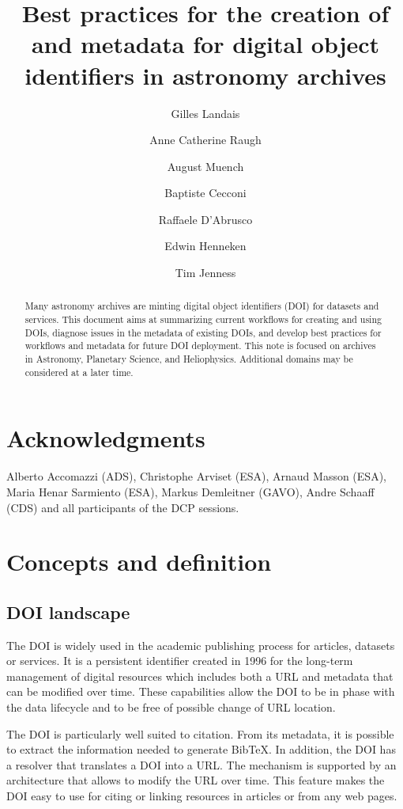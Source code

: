 \documentclass[11pt,a4paper]{ivoa}
\title{Best practices for the creation of and metadata for digital object identifiers in astronomy archives}
\author[https://orcid.org/0000-0003-4868-5873]{Gilles Landais}
\author[https://orcid.org/0000-0002-8300-9443]{Anne Catherine Raugh}
\author[https://orcid.org/0000-0003-0666-6367]{August Muench}
\author[https://orcid.org/0000-0001-7915-5571]{Baptiste Cecconi}
\author[https://orcid.org/0000-0003-3073-0605]{Raffaele D'Abrusco}
\author[https://orcid.org/0000-0003-4264-2450]{Edwin Henneken}
\author[https://orcid.org/0000-0001-5982-167X]{Tim Jenness}
\begin{document}
\begin{abstract}
	
	
	
	
Many astronomy archives are minting digital object identifiers (DOI) for datasets and services. This document aims at summarizing current workflows for creating and using DOIs, diagnose issues in the metadata of existing DOIs, and develop best practices for workflows and metadata for future DOI deployment. This note is focused on archives in Astronomy, Planetary Science, and Heliophysics. Additional domains may be considered at a later time.
\end{abstract}

\section*{Acknowledgments}
Alberto Accomazzi (ADS), Christophe Arviset (ESA), Arnaud Masson (ESA), Maria Henar Sarmiento (ESA), Markus Demleitner (GAVO), Andre Schaaff (CDS) and all participants of the DCP sessions.


\section{Concepts and definition}\hypertarget{concept-and-definition}{}\label{sec:concepts-and-definition}

\subsection{DOI landscape}\hypertarget{doi-landscape}{}\label{sec:doi-landscape}

The DOI is widely used in the academic publishing process for articles, datasets or services. It is a persistent identifier created in 1996 for the long-term management of digital resources which includes both a URL and metadata that can be modified over time. These capabilities allow the DOI to be in phase with the data lifecycle and to be free of possible change of URL location.

The DOI is particularly well suited to citation. From its metadata, it is possible to extract the information needed to generate BibTeX. In addition, the DOI has a resolver that translates a DOI into a URL. The mechanism is supported by an architecture that allows to modify the URL over time. This feature makes the DOI easy to use for citing or linking resources in articles or from any web pages.
\end{document}
